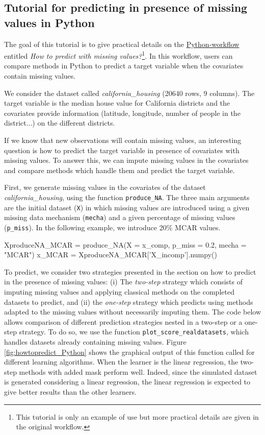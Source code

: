 \begin{appendix}
\subsection{Tutorial for predicting in presence of missing values in Python} \label{app:tutopython}

The goal of this tutorial is to give practical details on the \href{https://rmisstastic.netlify.app/how-to/python/predict_html/how\%20to\%20predict}{{Python}-workflow} entitled \textit{How to predict with missing values?}\footnote{This tutorial is only an example of use but more practical details are given in the original workflow.}. In this workflow, users can compare methods in {Python} to predict a target variable when the covariates contain missing values. 

We consider the dataset called \textit{california\_housing} (20640 rows, 9 columns). The target variable is the median house value for California districts and the covariates provide information (latitude, longitude, number of people in the district...) on the different districts. 

If we know that new observations will contain missing values, an interesting question is how to predict the target variable in presence of covariates with missing values. To answer this, we can impute missing values in the covariates and compare methods which handle them and predict the target variable. 

First, we generate missing values in the covariates of the dataset \textit{california\_housing}, using the function \texttt{produce\_NA}. The three main arguments are the initial dataset (\texttt{X}) in which missing values are introduced using a given missing data mechanism (\texttt{mecha}) and a given percentage of missing values (\texttt{p\_miss}). In the following example, we introduce 20\% MCAR values. 

\begin{example}
XproduceNA_MCAR = produce_NA(X = x_comp, p_miss = 0.2, mecha = "MCAR")
x_MCAR = XproduceNA_MCAR['X_incomp'].numpy()
\end{example}

To predict, we consider two strategies presented in the section on how to predict in the presence of missing values: (i) The \textit{two-step} strategy which consists of imputing missing values and applying classical methods on the completed datasets to predict, and (ii) the \textit{one-step} strategy which predicts using methods adapted to the missing values without necessarily imputing them. The code below allows comparison of different prediction strategies nested in a two-step or a one-step strategy. To do so, we use the function \texttt{plot\_score\_realdatasets}, which handles datasets already containing missing values. Figure \ref{fig:howtopredict_Python} shows the graphical output of this function called for different learning algorithms. When the learner is the linear regression, the two-step methods with added mask perform well. Indeed, since the simulated dataset is generated considering a linear regression, the linear regression is expected to give better results than the other learners. 


\end{appendix}
